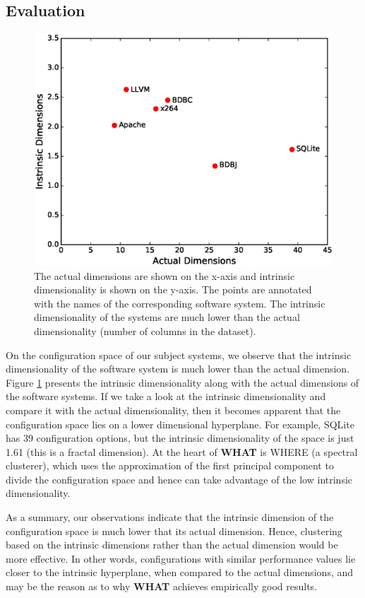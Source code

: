 \documentclass[smallextended]{svjour3}       %
\newcommand{\what}{{\bf WHAT}\xspace}
\begin{document}
\subsection{Evaluation}
\begin{figure}[t]
\includegraphics[width=0.9\columnwidth]{Figures/underlying_dimension}
\caption{The actual dimensions are shown on the x-axis and intrinsic dimensionality is shown on the y-axis. The points are annotated with the names of the corresponding software system. The intrinsic dimensionality of the systems are much lower than the actual dimensionality (number of columns in the dataset).}
\label{fig:underlying_d}
\end{figure}
On the configuration space of our subject systems, we observe that {the intrinsic dimensionality of the software system is much lower than the actual dimension}. Figure \ref{fig:underlying_d} presents the intrinsic dimensionality along with the actual dimensions of the software systems. If we take a look at the intrinsic dimensionality and compare it with the actual dimensionality, then it becomes apparent that the configuration space lies on a lower dimensional hyperplane. For example, SQLite has 39 configuration options, but the intrinsic dimensionality of the space is just 1.61 (this is a fractal dimension). At the heart of \what is WHERE (a spectral clusterer), which uses the approximation of the first principal component to divide the configuration space and hence can take advantage of the low intrinsic dimensionality. 

As a summary, our observations indicate that the intrinsic dimension of the configuration space is much lower that its actual dimension. Hence, clustering based on the intrinsic dimensions rather than the actual dimension would be more effective. In other words, configurations with similar performance values lie closer to the intrinsic hyperplane, when compared to the actual dimensions, and may be the reason as to why \what achieves empirically good results.
\end{document}
